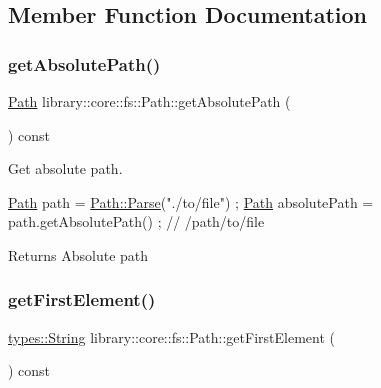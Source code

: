 \subsection{Member Function Documentation}
\mbox{\label{classlibrary_1_1core_1_1fs_1_1Path_a09dc880115d1e0a9079ac8e106e82c92}} 
\subsubsection{\texorpdfstring{get\+Absolute\+Path()}{getAbsolutePath()}}
{\footnotesize\ttfamily \hyperlink{classlibrary_1_1core_1_1fs_1_1Path}{Path} library\+::core\+::fs\+::\+Path\+::get\+Absolute\+Path (\begin{DoxyParamCaption}{ }\end{DoxyParamCaption}) const}



Get absolute path. 


\begin{DoxyCode}
\hyperlink{classlibrary_1_1core_1_1fs_1_1Path_aaba9a8e0153813f08f78f1c3275734a4}{Path} path = \hyperlink{classlibrary_1_1core_1_1fs_1_1Path_aebf5bd3af83e0b7376616e146f3e55df}{Path::Parse}(\textcolor{stringliteral}{"./to/file"}) ;
\hyperlink{classlibrary_1_1core_1_1fs_1_1Path_aaba9a8e0153813f08f78f1c3275734a4}{Path} absolutePath = path.getAbsolutePath() ; \textcolor{comment}{// /path/to/file}
\end{DoxyCode}


\begin{DoxyReturn}{Returns}
Absolute path 
\end{DoxyReturn}
\mbox{\label{classlibrary_1_1core_1_1fs_1_1Path_a431c7842c8a0d5fc314b676a8487e5af}} 
\subsubsection{\texorpdfstring{get\+First\+Element()}{getFirstElement()}}
{\footnotesize\ttfamily \hyperlink{classlibrary_1_1core_1_1types_1_1String}{types\+::\+String} library\+::core\+::fs\+::\+Path\+::get\+First\+Element (\begin{DoxyParamCaption}{ }\end{DoxyParamCaption}) const}




